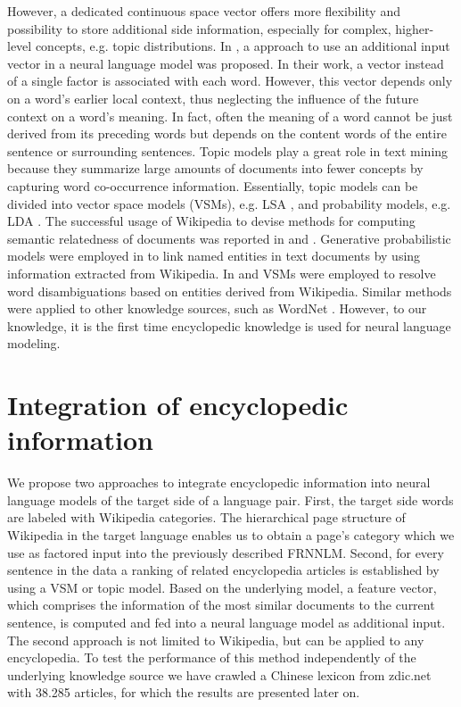 \documentclass[a4paper]{article}
\begin{document}
However, a dedicated continuous space vector offers more flexibility and possibility to store additional side information, especially for complex, higher-level concepts, e.g. topic distributions. In \cite{mikolov2012context}, a approach to use an additional input vector in a neural language model was proposed. In their work, a vector instead of a single factor is associated with each word. However, this vector depends only on a word's earlier local context, thus neglecting the influence of the future context on a word's meaning. 
In fact, often the meaning of a word cannot be just derived from its preceding words but depends on the content words of the entire sentence or surrounding sentences. 
Topic models play a great role in text mining because they summarize large amounts of documents into fewer concepts by capturing word co-occurrence information. Essentially, topic models can be divided into vector space models (VSMs), e.g. LSA \cite{deerwester1990indexing}, and probability models, e.g. LDA \cite{blei2003latent}. 
The successful usage of Wikipedia to devise methods for computing semantic relatedness of documents was reported in \cite{gabrilovich2007computing} and \cite{strube2006wikirelate}.
Generative probabilistic models were employed in \cite{han2012entity} to link named entities in text documents by using information extracted from Wikipedia. 
In \cite{cucerzan2007large} and \cite{bunescu2006using} VSMs were employed to resolve word disambiguations based on entities derived from Wikipedia.
Similar methods were applied to other knowledge sources, such as WordNet \cite{hearst1992automatic}.
However, to our knowledge, it is the first time encyclopedic knowledge is used for neural language modeling.

\section{Integration of encyclopedic information}
We propose two approaches to integrate encyclopedic information into neural language models of the target side of a language pair.
First, the target side words are labeled with Wikipedia categories. The hierarchical page structure of Wikipedia in the target language enables us to obtain a page's category which we use as factored input into the previously described FRNNLM.
Second, for every sentence in the data a ranking of related encyclopedia articles is established by using a VSM or topic model. Based on the underlying model, a feature vector, which comprises the information of the most similar documents to the current sentence, is computed  and fed into a neural language model as additional input. The second approach is not limited to Wikipedia, but can be applied to any encyclopedia. To test the performance of this method independently of the underlying knowledge source we have crawled a Chinese lexicon from zdic.net \cite{zdic} with 38.285 articles, for which the results are presented later on. 
\end{document}

